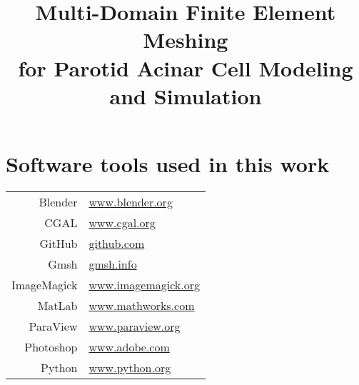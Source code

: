 \documentclass[10pt,letterpaper]{article}
\title{Multi-Domain Finite Element Meshing\\for Parotid Acinar Cell Modeling and Simulation}
\date{}
\begin{document}
\maketitle
\thispagestyle{empty}

\section*{Software tools used in this work}
\flushleft

\begin{table}[h!]
\begin{tabular}{rl}
Blender &\url{www.blender.org}\\
CGAL &\url{www.cgal.org}\\
GitHub &\url{github.com}\\
Gmsh &\url{gmsh.info}\\
ImageMagick &\url{www.imagemagick.org}\\
MatLab &\url{www.mathworks.com}\\
ParaView &\url{www.paraview.org}\\
Photoshop &\url{www.adobe.com}\\
Python &\url{www.python.org}\\
\end{tabular}
\end{table}
\end{document}

